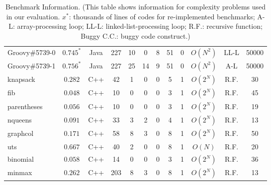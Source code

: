 \begin{table}[h!]
{\begin{tabular}{lccccccccccc}
    \midrule
    Groovy\#5739-0        & $0.745^*$  & Java  & 227 & 10 & 0 & 8 & 51 & 0                                                & $O(N^{2})$ & LL-L& 50000 \\
    Groovy\#5739-1        & $0.756^*$  & Java  &227  & 25 &  14 & 9 & 51 & 0                                              & $O(N^{2})$ & A-L & 50000 \\
    \midrule
    \midrule
    knapsack      &  $0.282$  & C++  & 42 & 1 & 0 & 0 & 5 & 1                                                                            & $O(2^{N})$ & R.F. & 30  \\
    fib      &  $0.048$ & C++  & 10 & 0 & 0 & 0 & 3 & 1                                                                                  & $O(2^{N})$ & R.F. & 45 \\
    parentheses      & $0.056$   & C++  & 10 & 0 & 0 & 0 & 3 & 1                                                                         & $O(2^{N})$ & R.F. & 19 \\
    nqueens      & $0.091$  & C++  & 33 & 3 & 2 & 0 & 4 & 1                                                                              & $O(2^{N})$ & R.F. & 13 \\
    graphcol      &  $0.171$  & C++  & 58 & 8 & 3 & 0 & 8 & 1                                                                            & $O(2^{N})$ & R.F. & 50 \\
    uts      &  $0.667$  & C++  & 40  & 2 & 0 & 0 & 8 & 1                                                                                & $O(N)$     & R.F. & 20 \\
    binomial      &  $0.058$  & C++  & 14 & 0 & 0 & 0 & 3 & 1                                                                            & $O(2^{N})$ & R.F. & 36 \\
    minmax      &  $0.262$  & C++  & 203 & 8 & 3 & 0 & 8 & 1                                                                             & $O(2^{N})$ & R.F. & 13 \\


    \bottomrule
   \end{tabular}
   }
  \caption{Benchmark Information.
  \footnotesize{(This table shows information for complexity problems used in our evaluation. 
   $x^*$: thousands of lines of codes for re-implemented benchmarks; 
   A-L: array-processing loop; 
   LL-L: linked-list-processing loop; 
   R.F.: recursive function; 
   Buggy C.C.: buggy code construct.)}}
  \label{tab:benchmark_info}
\end{table}